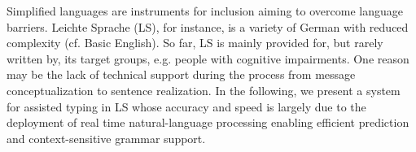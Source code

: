 Simplified languages are instruments for inclusion aiming to overcome language barriers. Leichte Sprache (LS), for instance, is a variety of German with reduced complexity (cf. Basic English). So far, LS is mainly provided for, but rarely written by, its target groups, e.g. people with cognitive impairments. One reason may be the lack of technical support during the process from message conceptualization to sentence realization. In the following, we present a system for assisted typing in LS whose accuracy and speed is largely due to the deployment of real time natural-language processing enabling efficient prediction and context-sensitive grammar support.
